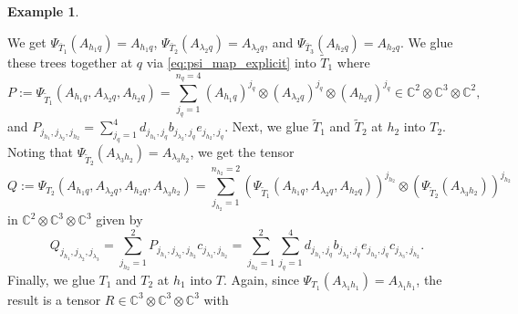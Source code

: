 \documentclass[12pt]{article}
\theoremstyle{definition}
\newtheorem{example}[theorem]{Example}
\numberwithin{theorem}{section}
\newcommand{\CC}{\mathbb{C}}
\begin{document}
\begin{example}
\begin{center}
\end{center}
We get $\Psi_{\bar{T}_1}(A_{h_1q}) = A_{h_1q}$,  $\Psi_{\bar{T}_2}(A_{\lambda_2q}) = A_{\lambda_2q}$, and $\Psi_{\bar{T}_3}(A_{h_2q}) = A_{h_2q}$. We glue these trees together at $q$ via \eqref{eq:psi_map_explicit} into $\tilde{T}_1$ where
 \begin{equation*}
     P := \Psi_{\tilde{T}_1}(A_{h_1 q}, A_{\lambda_2 q}, A_{h_2 q}) = \sum_{j_q=1}^{n_q = 4}(A_{h_1 q})^{j_q}\otimes (A_{\lambda_2 q})^{j_q}\otimes (A_{h_2 q})^{j_q} \in \CC^2 \otimes \CC^3 \otimes \CC^2,
 \end{equation*}
 and $P_{j_{h_1}, j_{\lambda_2}, j_{h_2}} = \sum_{j_q=1}^{4}d_{j_{h_1}, j_q}b_{j_{\lambda_2}, j_q}e_{j_{h_2}, j_q}$.
Next, we glue $\tilde{T}_1$ and $\tilde{T}_2$ at $h_2$ into $T_2$. Noting that $\Psi_{\tilde{T}_2}(A_{\lambda_3h_2}) = A_{\lambda_3h_2}$, we get the tensor
\begin{equation*}
    Q := \Psi_{T_2}(A_{h_1 q}, A_{\lambda_2 q}, A_{h_2 q}, A_{\lambda_3h_2}) = \sum_{j_{h_2}=1}^{n_{h_2}=2}(\Psi_{\tilde{T}_1}(A_{h_1 q}, A_{\lambda_2 q}, A_{h_2 q}))^{j_{h_2}}\otimes(\Psi_{\tilde{T}_2}(A_{\lambda_3h_2}))^{j_{h_2}}
\end{equation*}
in $\CC^2 \otimes \CC^3 \otimes \CC^3$ given by
\begin{equation*}
    Q_{j_{h_1}, j_{\lambda_2}, j_{\lambda_3}} = \sum_{j_{h_2}=1}^2 P_{j_{h_1}, j_{\lambda_2}, j_{h_2}}c_{j_{\lambda_3}, j_{h_2}} = \sum_{j_{h_2}=1}^2 \sum_{j_q=1}^4 d_{j_{h_1}, j_q}b_{j_{\lambda_2}, j_q}e_{j_{h_2}, j_q}c_{j_{\lambda_3}, j_{h_2}}.
\end{equation*}
Finally, we glue $T_1$ and $T_2$ at $h_1$ into $T$. Again, since $\Psi_{T_1}(A_{\lambda_1h_1}) = A_{\lambda_1 h_1}$, the result is a tensor $R \in \CC^3 \otimes \CC^3 \otimes \CC^3$ with 

\end{example}
\end{document}
